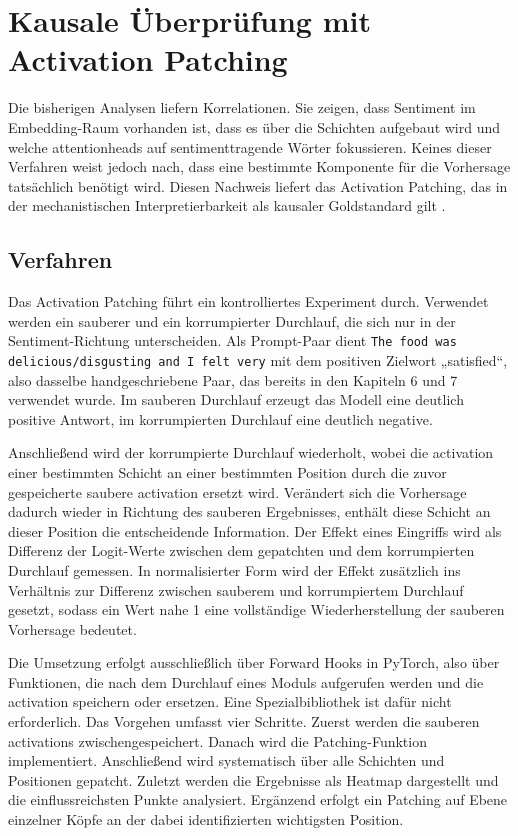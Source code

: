 \section{Kausale Überprüfung mit Activation Patching}

Die bisherigen Analysen liefern Korrelationen. Sie zeigen, dass Sentiment im Embedding-Raum vorhanden ist, dass es über die Schichten aufgebaut wird und welche \glspl{attentionhead} auf sentimenttragende Wörter fokussieren. Keines dieser Verfahren weist jedoch nach, dass eine bestimmte Komponente für die Vorhersage tatsächlich benötigt wird. Diesen Nachweis liefert das Activation Patching, das in der mechanistischen Interpretierbarkeit als kausaler Goldstandard gilt \cite{meng2022locating, goldowskydill2023localizing}.

\subsection{Verfahren}

Das Activation Patching führt ein kontrolliertes Experiment durch. Verwendet werden ein sauberer und ein korrumpierter Durchlauf, die sich nur in der Sentiment-Richtung unterscheiden. Als Prompt-Paar dient \texttt{The food was delicious/disgusting and I felt very} mit dem positiven Zielwort „satisfied“, also dasselbe handgeschriebene Paar, das bereits in den Kapiteln 6 und 7 verwendet wurde. Im sauberen Durchlauf erzeugt das Modell eine deutlich positive Antwort, im korrumpierten Durchlauf eine deutlich negative.

Anschließend wird der korrumpierte Durchlauf wiederholt, wobei die \gls{activation} einer bestimmten Schicht an einer bestimmten Position durch die zuvor gespeicherte saubere \gls{activation} ersetzt wird. Verändert sich die Vorhersage dadurch wieder in Richtung des sauberen Ergebnisses, enthält diese Schicht an dieser Position die entscheidende Information. Der Effekt eines Eingriffs wird als Differenz der Logit-Werte zwischen dem gepatchten und dem korrumpierten Durchlauf gemessen. In normalisierter Form wird der Effekt zusätzlich ins Verhältnis zur Differenz zwischen sauberem und korrumpiertem Durchlauf gesetzt, sodass ein Wert nahe 1 eine vollständige Wiederherstellung der sauberen Vorhersage bedeutet.

Die Umsetzung erfolgt ausschließlich über Forward Hooks in PyTorch, also über Funktionen, die nach dem Durchlauf eines Moduls aufgerufen werden und die \gls{activation} speichern oder ersetzen. Eine Spezialbibliothek ist dafür nicht erforderlich. Das Vorgehen umfasst vier Schritte. Zuerst werden die sauberen \glspl{activation} zwischengespeichert. Danach wird die Patching-Funktion implementiert. Anschließend wird systematisch über alle Schichten und Positionen gepatcht. Zuletzt werden die Ergebnisse als Heatmap dargestellt und die einflussreichsten Punkte analysiert. Ergänzend erfolgt ein Patching auf Ebene einzelner Köpfe an der dabei identifizierten wichtigsten Position.

